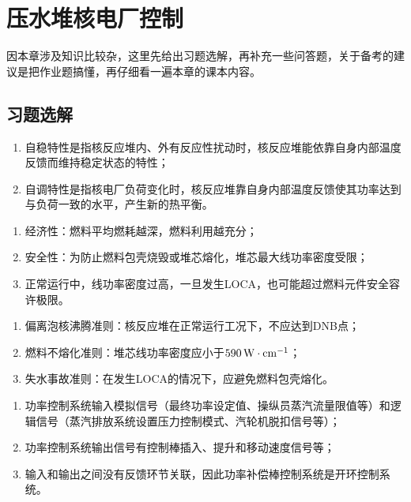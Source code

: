 \section{压水堆核电厂控制}

因本章涉及知识比较杂，这里先给出习题选解，再补充一些问答题，关于备考的建议是把作业题搞懂，再仔细看一遍本章的课本内容。

\subsection{习题选解}

\setcounter{exercise}{1}

\begin{exercise} %
    \begin{enumerate}
        \item 自稳特性是指核反应堆内、外有反应性扰动时，核反应堆能依靠自身内部温度反馈而维持稳定状态的特性；
        \item 自调特性是指核电厂负荷变化时，核反应堆靠自身内部温度反馈使其功率达到与负荷一致的水平，产生新的热平衡。
    \end{enumerate}
\end{exercise}

\setcounter{exercise}{3}

\begin{exercise} %
    \begin{enumerate}
        \item 经济性：燃料平均燃耗越深，燃料利用越充分；
        \item 安全性：为防止燃料包壳烧毁或堆芯熔化，堆芯最大线功率密度受限；
        \item 正常运行中，线功率密度过高，一旦发生LOCA，也可能超过燃料元件安全容许极限。
    \end{enumerate}
\end{exercise}

\begin{exercise} %
    \begin{enumerate}
        \item 偏离泡核沸腾准则：核反应堆在正常运行工况下，不应达到DNB点；
        \item 燃料不熔化准则：堆芯线功率密度应小于$590\,{\rm W \cdot cm^{-1}}$；
        \item 失水事故准则：在发生LOCA的情况下，应避免燃料包壳熔化。
    \end{enumerate}
\end{exercise}

\begin{exercise} %
    \begin{enumerate}
        \item 功率控制系统输入模拟信号（最终功率设定值、操纵员蒸汽流量限值等）和逻辑信号（蒸汽排放系统设置压力控制模式、汽轮机脱扣信号等）；
        \item 功率控制系统输出信号有控制棒插入、提升和移动速度信号等；
        \item 输入和输出之间没有反馈环节关联，因此功率补偿棒控制系统是开环控制系统。
    \end{enumerate}
\end{exercise}

